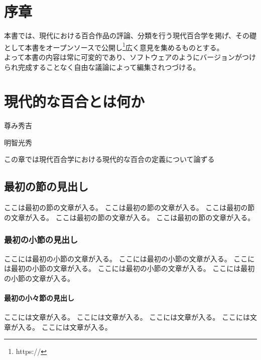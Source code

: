 \documentclass[ %
	uplatex,%
	a5paper,%
	papersize%
	]{jsbook}
\begin{document}
						\pagecolor{white}
						\color{black}
						\frontmatter

						\chapter{序章}

						本書では、現代における百合作品の評論、分類を行う現代百合学を掲げ、その礎として本書をオープンソースで公開し\footnote{https://}広く意見を集めるものとする。\\
						よって本書の内容は常に可変的であり、ソフトウェアのようにバージョンがつけられ完成することなく自由な議論によって編集されつづける。

						\tableofcontents %

						\mainmatter

						\chapter{現代的な百合とは何か}

						\epigraph{尊み秀吉}{明智光秀}

						\begin{summary}
							この章では現代百合学における現代的な百合の定義について論ずる
						\end{summary}

						\section{最初の節の見出し}

						ここは最初の節の文章が入る。
						ここは最初の節の文章が入る。
						ここは最初の節の文章が入る。
						ここは最初の節の文章が入る。
						ここは最初の節の文章が入る。

						\subsection{最初の小節の見出し}

						ここには最初の小節の文章が入る。
						ここには最初の小節の文章が入る。
						ここには最初の小節の文章が入る。
						ここには最初の小節の文章が入る。
						ここには最初の小節の文章が入る。

						\subsubsection{最初の小々節の見出し}

						ここには文章が入る。
						ここには文章が入る。
						ここには文章が入る。
						ここには文章が入る。
						ここには文章が入る。
\end{document}
